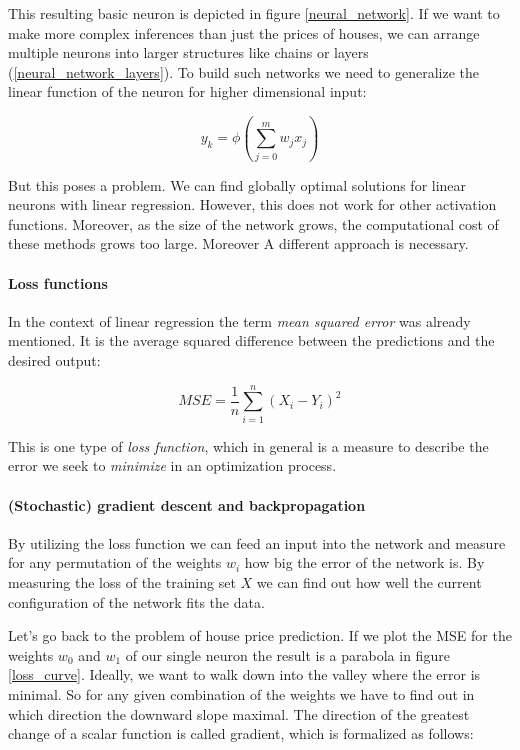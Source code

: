 This resulting basic neuron is depicted in figure \ref{neural_network}. If we want to make more complex inferences than just the prices of houses, we can arrange multiple neurons into larger structures like chains or layers (\ref{neural_network_layers}). To build such networks we need to generalize the linear function of the neuron for higher dimensional input:

\begin{equation}
    y_k = \phi\left(\sum_{j=0}^{m}w_jx_j\right)
\end{equation}

But this poses a problem. We can find globally optimal solutions for linear neurons with linear regression. However, this does not work for other activation functions. Moreover, as the size of the network grows, the computational cost of these methods grows too large. Moreover A different approach is necessary.

\paragraph{Loss functions} In the context of linear regression the term \textit{mean squared error} was already mentioned. It is the average squared difference between the predictions and the desired output:

\begin{equation}
    MSE = \frac{1}{n} \sum_{i = 1}^{n}(X_i - Y_i)^2
\end{equation}

This is one type of \textit{loss function}, which in general is a measure to describe the error we seek to \textit{minimize} in an optimization process.


\paragraph{(Stochastic) gradient descent and backpropagation} By utilizing the loss function we can feed an input into the network and measure for any permutation of the weights $ w_i $ how big the error of the network is. By measuring the loss of the training set $ X $ we can find out how well the current configuration of the network fits the data.

Let's go back to the problem of house price prediction. If we plot the MSE for the weights $ w_0 $ and $ w_1 $ of our single neuron the result is a parabola in figure \ref{loss_curve}. Ideally, we want to walk down into the valley where the error is minimal. So for any given combination of the weights we have to find out in which direction the downward slope maximal. The direction of the greatest change of a scalar function is called gradient, which is formalized as follows:


